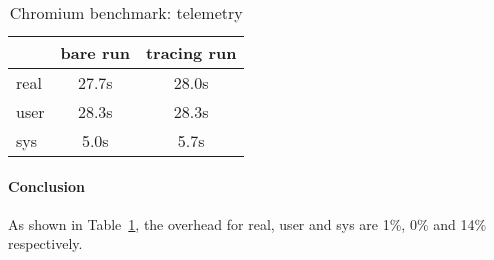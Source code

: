 \begin{table}[ht]
\begin{tabular}{l|c|c}
\hline
 & bare run & tracing run \\
\hline
real & 27.7s & 28.0s \\
\hline
user & 28.3s & 28.3s \\
\hline
sys &  5.0s & 5.7s\\
\hline
\end{tabular}
\caption{Chromium benchmark: telemetry}
\label{tab:chromium benchmark}
\end{table}

\paragraph{Conclusion}
As shown in Table~\ref{tab:chromium benchmark}, the overhead for real, user and
sys are 1\%, 0\% and 14\% respectively.
